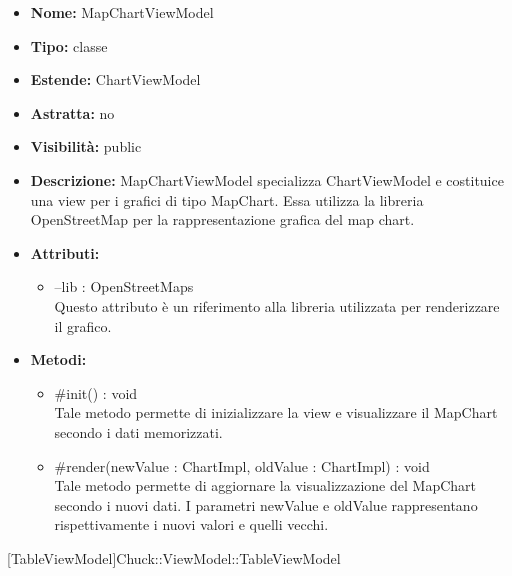			
			\begin{itemize}
			\item \textbf{Nome:} MapChartViewModel
			\item \textbf{Tipo:} classe
			
		\item \textbf{Estende:}
		ChartViewModel
		\item \textbf{Astratta:}
		no
			\item \textbf{Visibilità:} public
			\item \textbf{Descrizione:} MapChartViewModel specializza ChartViewModel e costituice una view per i grafici di tipo MapChart. Essa utilizza la libreria OpenStreetMap per la rappresentazione grafica del map chart.
			\item \textbf{Attributi:}
				\begin{itemize}
				\setlength{\itemsep}{5pt}
				
					\item[\ding{111}] {--lib : OpenStreetMaps} \\ [1mm] Questo attributo è un riferimento alla libreria utilizzata per renderizzare il grafico.
				\end{itemize}
		
			\item \textbf{Metodi:}
				\begin{itemize}
				\setlength{\itemsep}{5pt}
				
					\item[\ding{111}] {{\#init() : void}} \\ [1mm] Tale metodo permette di inizializzare la view e visualizzare il MapChart secondo i dati memorizzati.
					\item[\ding{111}] {{\#render(newValue : ChartImpl, oldValue : ChartImpl) : void}} \\ [1mm] Tale metodo permette di aggiornare la visualizzazione del MapChart secondo i nuovi dati. I parametri newValue e oldValue rappresentano rispettivamente i nuovi valori e quelli vecchi.
				\end{itemize}
		
			\end{itemize}

			
			[TableViewModel]{Chuck::ViewModel::TableViewModel}
			

	

